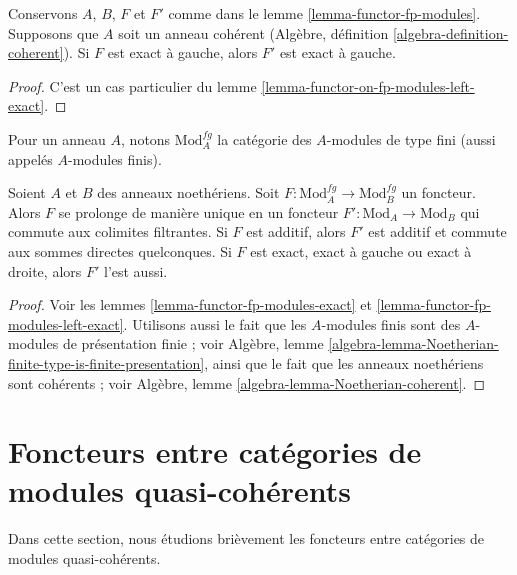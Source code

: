 \begin{lemma}
\label{lemma-functor-fp-modules-left-exact}
Conservons $A$, $B$, $F$ et $F'$ comme dans le lemme \ref{lemma-functor-fp-modules}.
Supposons que $A$ soit un anneau cohérent
(Algèbre, définition \ref{algebra-definition-coherent}).
Si $F$ est exact à gauche, alors $F'$ est exact à gauche.
\end{lemma}

\begin{proof}
C'est un cas particulier du lemme \ref{lemma-functor-on-fp-modules-left-exact}.
\end{proof}

\noindent
Pour un anneau $A$, notons $\text{Mod}^{fg}_A$ la catégorie des
$A$-modules de type fini (aussi appelés $A$-modules finis).

\begin{lemma}
\label{lemma-functor-finite-modules}
Soient $A$ et $B$ des anneaux noethériens. Soit
$F : \text{Mod}^{fg}_A \to \text{Mod}^{fg}_B$ un foncteur.
Alors $F$ se prolonge de manière unique en un foncteur $F' : \text{Mod}_A \to \text{Mod}_B$
qui commute aux colimites filtrantes. Si $F$ est additif, alors
$F'$ est additif et commute aux sommes directes quelconques.
Si $F$ est exact, exact à gauche ou exact à droite, alors $F'$ l'est aussi.
\end{lemma}

\begin{proof}
Voir les lemmes \ref{lemma-functor-fp-modules-exact} et
\ref{lemma-functor-fp-modules-left-exact}.
Utilisons aussi le fait que les $A$-modules finis sont des $A$-modules de présentation finie ;
voir Algèbre, lemme
\ref{algebra-lemma-Noetherian-finite-type-is-finite-presentation},
ainsi que le fait que les anneaux noethériens sont cohérents ; voir
Algèbre, lemme \ref{algebra-lemma-Noetherian-coherent}.
\end{proof}









\section{Foncteurs entre catégories de modules quasi-cohérents}
\label{section-functor-quasi-coherent}

\noindent
Dans cette section, nous étudions brièvement les foncteurs entre catégories de
modules quasi-cohérents.

